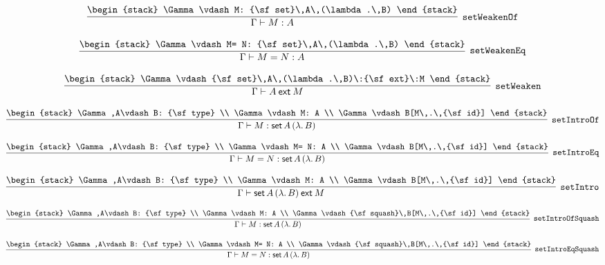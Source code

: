 \[
\infer[{\tt setWeakenOf}]{\Gamma \vdash M: A}{
\begin{stack}
\Gamma \vdash M: {\sf set}\,A\,(\lambda .\,B)
\end{stack}}
\]

\[
\infer[{\tt setWeakenEq}]{\Gamma \vdash M= N: A}{
\begin{stack}
\Gamma \vdash M= N: {\sf set}\,A\,(\lambda .\,B)
\end{stack}}
\]

\[
\infer[{\tt setWeaken}]{\Gamma \vdash A\:{\sf ext}\:M}{
\begin{stack}
\Gamma \vdash {\sf set}\,A\,(\lambda .\,B)\:{\sf ext}\:M
\end{stack}}
\]

\[
\infer[{\tt setIntroOf}]{\Gamma \vdash M: {\sf set}\,A\,(\lambda .\,B)}{
\begin{stack}
\Gamma ,A\vdash B: {\sf type}
\\
\Gamma \vdash M: A
\\
\Gamma \vdash B[M\,.\,{\sf id}]
\end{stack}}
\]

\[
\infer[{\tt setIntroEq}]{\Gamma \vdash M= N: {\sf set}\,A\,(\lambda .\,B)}{
\begin{stack}
\Gamma ,A\vdash B: {\sf type}
\\
\Gamma \vdash M= N: A
\\
\Gamma \vdash B[M\,.\,{\sf id}]
\end{stack}}
\]

\[
\infer[{\tt setIntro}]{\Gamma \vdash {\sf set}\,A\,(\lambda .\,B)\:{\sf ext}\:M}{
\begin{stack}
\Gamma ,A\vdash B: {\sf type}
\\
\Gamma \vdash M: A
\\
\Gamma \vdash B[M\,.\,{\sf id}]
\end{stack}}
\]

\[
\infer[{\tt setIntroOfSquash}]{\Gamma \vdash M: {\sf set}\,A\,(\lambda .\,B)}{
\begin{stack}
\Gamma ,A\vdash B: {\sf type}
\\
\Gamma \vdash M: A
\\
\Gamma \vdash {\sf squash}\,B[M\,.\,{\sf id}]
\end{stack}}
\]

\[
\infer[{\tt setIntroEqSquash}]{\Gamma \vdash M= N: {\sf set}\,A\,(\lambda .\,B)}{
\begin{stack}
\Gamma ,A\vdash B: {\sf type}
\\
\Gamma \vdash M= N: A
\\
\Gamma \vdash {\sf squash}\,B[M\,.\,{\sf id}]
\end{stack}}
\]


